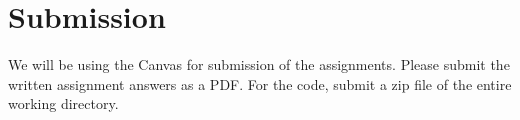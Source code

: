 \documentclass[tp]{lcc}
\begin{document}
\section{Submission}
We will be using the Canvas for submission of the assignments. Please submit the written assignment answers as a PDF. For the code, submit a zip file of the entire working directory.

\printbibliography
\end{document}
